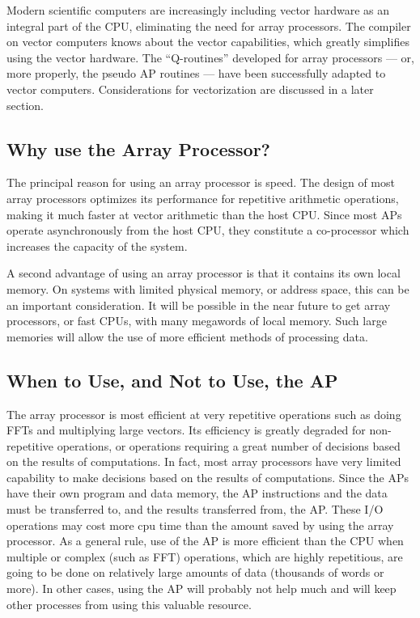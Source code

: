 Modern scientific computers are increasingly including vector hardware
as an integral part of the CPU, eliminating the need for array
processors.  The compiler on vector computers knows about the vector
capabilities, which greatly simplifies using the vector hardware.
The ``Q-routines'' developed for array processors --- or, more properly,
the pseudo AP routines --- have been successfully adapted to vector
computers.  Considerations for vectorization are discussed in a later
section.

\subsection{Why use the Array Processor?}
The principal reason for using an array processor is speed.  The
design of most array processors optimizes its performance for
repetitive arithmetic operations, making it much faster at vector
arithmetic than the host CPU.  Since most APs operate asynchronously
from the host CPU, they constitute a co-processor which increases the
capacity of the system.

A second advantage of using an array processor is that it contains its
own local memory.  On systems with limited physical memory, or address
space, this can be an important consideration.  It will be possible in
the near future to get array processors, or fast CPUs, with many
megawords of local memory.  Such large memories will allow the use of
more efficient methods of processing data.

\subsection{When to Use, and Not to Use, the AP}
The array processor is most efficient at very repetitive operations
such as doing FFTs and multiplying large vectors.  Its efficiency is
greatly degraded for non-repetitive operations, or operations
requiring a great number of decisions based on the results of
computations.  In fact, most array processors have very limited
capability to make decisions based on the results of computations.
Since the APs have their own program and data memory, the AP
instructions and the data must be transferred to, and the results
transferred from, the AP.  These I/O operations may cost more cpu time
than the amount saved by using the array processor. As a general rule,
use of the AP is more efficient than the CPU when multiple or complex
(such as FFT) operations, which are highly repetitious, are going to be
done on relatively large amounts of data (thousands of words or more).
In other cases, using the AP will probably not help much and will keep
other processes from using this valuable resource.

